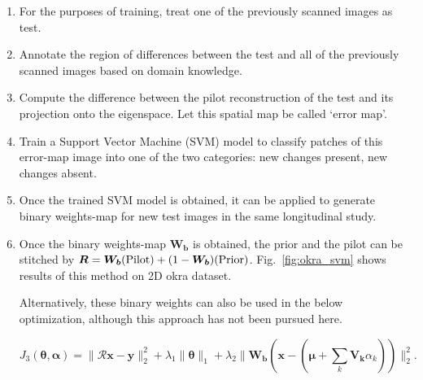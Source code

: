 \documentclass{article}
\begin{document}
\begin{enumerate}
\item For the purposes of training, treat one of the previously scanned images as test.
\item Annotate the region of differences between the test and all of the previously scanned images based on domain knowledge.
\item Compute the difference between the pilot reconstruction of the test and its projection onto the eigenspace. Let this spatial map be called `error map'.
\item Train a Support Vector Machine (SVM) model to classify patches of this error-map image into one of the two categories: new changes present, new changes absent.
\item Once the trained SVM model is obtained, it can be applied to generate binary weights-map for new test images in the same longitudinal study.
\item Once the binary weights-map $\boldsymbol{W_b}$ is obtained, the prior and the pilot can be stitched by $\boldsymbol{R} = \boldsymbol{W_b}(\rm{Pilot}) + (1-\boldsymbol{W_b})(\rm{Prior})$. Fig.~\ref{fig:okra_svm} shows results of this method on 2D okra dataset.

  Alternatively, these binary weights can also be used in the below optimization, although this approach has not been pursued here. 

\begin{equation}
J_3(\boldsymbol{\theta},\boldsymbol{\alpha}) = \lVert\boldsymbol{\mathcal{R} x}-\boldsymbol{y}\rVert_2^2  + \lambda_1\lVert\boldsymbol{\theta}\rVert_1 +\lambda_2\lVert\boldsymbol{W_b}(\boldsymbol{x} - (\boldsymbol{\mu} + \sum_{k}\boldsymbol{V_k}\alpha_k))\rVert_2^2.
\label{Eq:main}
\end{equation}

\end{enumerate} 
\end{document}
